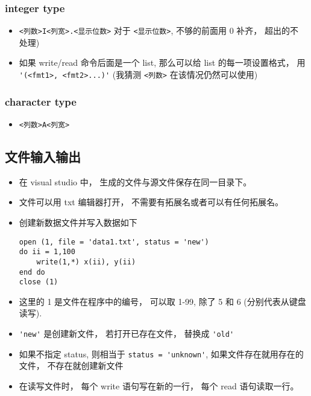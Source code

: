\subsubsection{integer type}
\begin{itemize}
\item \verb`<列数>I<列宽>.<显示位数>`  对于 \verb`<显示位数>`, 不够的前面用 0 补齐， 超出的不
   处理)
\item 如果 write/read 命令后面是一个 list, 那么可以给 list 的每一项设置格式， 用 \verb`'(<fmt1>, <fmt2>...)'`  (我猜测 \verb`<列数>` 在该情况仍然可以使用)
\end{itemize}

\subsubsection{character type}
\begin{itemize}
\item \verb`<列数>A<列宽>`
\end{itemize}

\subsection{文件输入输出}
\begin{itemize}
\item 在 visual studio 中， 生成的文件与源文件保存在同一目录下。
\item 文件可以用 txt 编辑器打开， 不需要有拓展名或者可以有任何拓展名。
\item 创建新数据文件并写入数据如下
\begin{lstlisting}[language=none]
open (1, file = 'data1.txt', status = 'new')
do ii = 1,100
	write(1,*) x(ii), y(ii)
end do
close (1)
\end{lstlisting}
\item 这里的 1 是文件在程序中的编号， 可以取 1-99, 除了 5 和 6 (分别代表从键盘读写).
\item \verb`'new'` 是创建新文件， 若打开已存在文件， 替换成 \verb`'old'`
\item 如果不指定 status, 则相当于 \verb`status = 'unknown'`, 如果文件存在就用存在的文件， 不存在就创建新文件
\item 在读写文件时， 每个 write 语句写在新的一行， 每个 read 语句读取一行。
\end{itemize}

